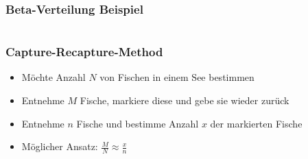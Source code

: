 \documentclass[aspectratio=169,xcolor=dvipsnames]{beamer}
\begin{document}
\begin{frame}
\frametitle{Beta-Verteilung Beispiel}
\begin{columns}
\end{columns}
\end{frame}

\begin{frame}
\frametitle{Capture-Recapture-Method}
\begin{itemize}
	\item<1-> Möchte Anzahl $N$ von Fischen in einem See bestimmen
	\item<2-> Entnehme $M$ Fische, markiere diese und gebe sie wieder zurück
	\item<3-> Entnehme $n$ Fische und bestimme Anzahl $x$ der markierten Fische
	\item<4-> Möglicher Ansatz: $\frac{M}{N}\approx \frac{x}{n}$
\end{itemize}
\end{frame}
\end{document}
